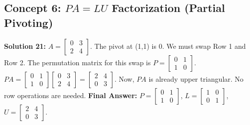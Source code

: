 \documentclass[11pt]{article}
\begin{document}
\subsection*{Concept 6: $PA = LU$ Factorization (Partial Pivoting)}

\textbf{Solution 21:}
$A = \begin{bmatrix} 0 & 3 \\ 2 & 4 \end{bmatrix}$. The pivot at (1,1) is 0. We must swap Row 1 and Row 2.
The permutation matrix for this swap is $P = \begin{bmatrix} 0 & 1 \\ 1 & 0 \end{bmatrix}$.
$PA = \begin{bmatrix} 0 & 1 \\ 1 & 0 \end{bmatrix} \begin{bmatrix} 0 & 3 \\ 2 & 4 \end{bmatrix} = \begin{bmatrix} 2 & 4 \\ 0 & 3 \end{bmatrix}$.
Now, $PA$ is already upper triangular. No row operations are needed.
\textbf{Final Answer:} $P = \begin{bmatrix} 0 & 1 \\ 1 & 0 \end{bmatrix}$, $L = \begin{bmatrix} 1 & 0 \\ 0 & 1 \end{bmatrix}$, $U = \begin{bmatrix} 2 & 4 \\ 0 & 3 \end{bmatrix}$.
\end{document}
